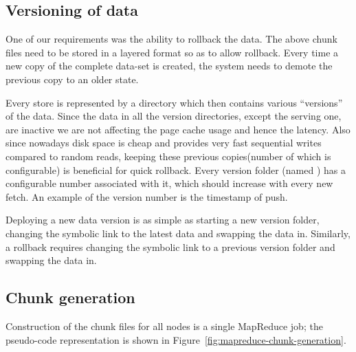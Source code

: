 \subsection{Versioning of data}
\label{sec:read_only:versioning}

One of our requirements was the ability to rollback the data. The
above chunk files need to be stored in a layered format so as to allow
rollback. Every time a new copy of the complete data-set is created,
the system needs to demote the previous copy to an older state.

Every store is represented by a directory which then contains various
``versions'' of the data. Since the data in all the version
directories, except the serving one, are inactive we are not affecting
the page cache usage and hence the latency. Also since nowadays disk
space is cheap and provides very fast sequential writes compared to
random reads, keeping these previous copies(number of which is
configurable) is beneficial for quick rollback. Every version folder
(named ) has a configurable number associated
with it, which should increase with every new fetch. An example of the
version number is the timestamp of push. 

Deploying a new data version is as simple as starting a new version
folder, changing the symbolic link to the latest data and swapping the
data in. Similarly, a rollback requires changing the symbolic link to a 
previous version folder and swapping the data in. 


\subsection{Chunk generation}
\label{sec:read_only:chunk_generation}

Construction of the chunk files for all \projectname{} nodes is a
single MapReduce job; the pseudo-code representation is shown in
Figure~\ref{fig:mapreduce-chunk-generation}.

